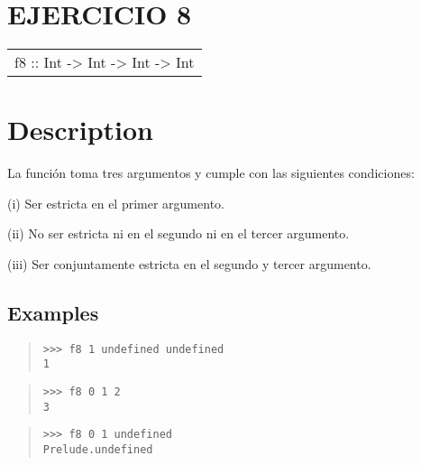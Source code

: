 \section{EJERCICIO 8}
\begin{haddockdesc}
\item[\begin{tabular}{@{}l}
f8 :: Int -> Int -> Int -> Int
\end{tabular}]
{\haddockbegindoc
\section*{Description}
La función toma tres argumentos y cumple con las siguientes condiciones:\par
(i) Ser estricta en el primer argumento.\par
(ii) No ser estricta ni en el segundo ni en el tercer argumento.\par
(iii) Ser conjuntamente estricta en el segundo y tercer argumento.\par
\subsection*{Examples}
\begin{quote}
{\haddockverb\begin{verbatim}
>>> f8 1 undefined undefined
1

\end{verbatim}}
\end{quote}
\begin{quote}
{\haddockverb\begin{verbatim}
>>> f8 0 1 2
3

\end{verbatim}}
\end{quote}
\begin{quote}
{\haddockverb\begin{verbatim}
>>> f8 0 1 undefined
Prelude.undefined

\end{verbatim}}
\end{quote}}
\end{haddockdesc}
